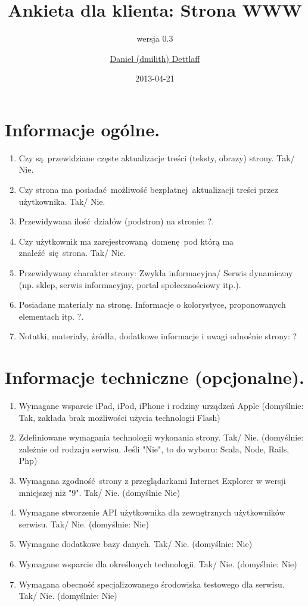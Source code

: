 \documentclass[11pt,a4paper]{scrartcl}
\title{Ankieta dla klienta: Strona WWW}
\subtitle{wersja 0.3}
\author{\href{mailto:dmilith@verknowsys.com}{Daniel (dmilith) Dettlaff}}
\date{2013-04-21}
\begin{document}
\renewcommand\thesection{\arabic{section}.}
\renewcommand\thesubsection{\arabic{section}.\arabic{subsection}.}
\renewcommand\thesubsubsection{\arabic{section}.\arabic{subsection}.\arabic{subsubsection}.}

\maketitle

\section{Informacje ogólne.}\label{sec:ogolne}
  \begin{enumerate}
    \item Czy są przewidziane częste aktualizacje treści (teksty, obrazy) strony. Tak/ Nie.
    \item Czy strona ma posiadać możliwość bezpłatnej aktualizacji treści przez użytkownika. Tak/ Nie.
    \item Przewidywana ilość działów (podstron) na stronie: ?.
    \item Czy użytkownik ma zarejestrowaną domenę pod którą ma znaleźć się strona. Tak/ Nie.
    \item Przewidywany charakter strony: Zwykła informacyjna/ Serwis dynamiczny (np. sklep, serwis informacyjny, portal społecznościowy itp.).
    \item Posiadane materiały na stronę. Informacje o kolorystyce, proponowanych elementach itp. ?.
    \item Notatki, materiały, źródła, dodatkowe informacje i uwagi odnośnie strony: ?
  \end{enumerate}


\section{Informacje techniczne (opcjonalne).}\label{sec:techniczne}
  \begin{enumerate}
    \item Wymagane wsparcie iPad, iPod, iPhone i rodziny urządzeń Apple (domyślnie: Tak, zakłada brak możliwości użycia technologii Flash)
    \item Zdefiniowane wymagania technologii wykonania strony. Tak/ Nie. (domyślnie: zależnie od rodzaju serwisu. Jeśli "Nie", to do wyboru: Scala, Node, Rails, Php)
    \item Wymagana zgodność strony z przeglądarkami Internet Explorer w wersji mniejszej niż "9". Tak/ Nie. (domyślnie Nie)
    \item Wymagane stworzenie API użytkownika dla zewnętrznych użytkowników serwisu. Tak/ Nie. (domyślnie: Nie)
    \item Wymagane dodatkowe bazy danych. Tak/ Nie. (domyślnie: Nie)
    \item Wymagane wsparcie dla określonych technologii. Tak/ Nie. (domyślnie: Nie)
    \item Wymagana obecność specjalizowanego środowiska testowego dla serwisu. Tak/ Nie. (domyślnie: Nie)
  \end{enumerate}
\end{document}
